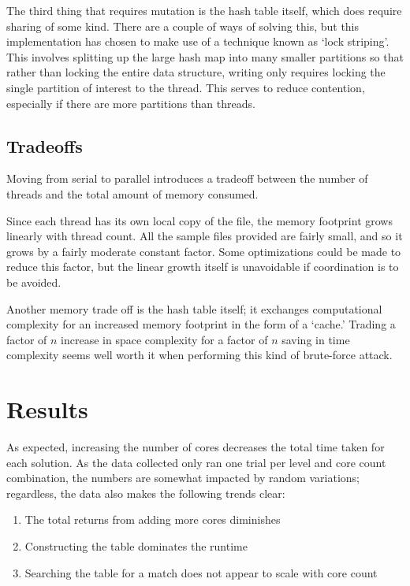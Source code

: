 \documentclass[12pt]{article}
\begin{document}
  The third thing that requires mutation is the hash table itself, which does
  require sharing of some kind. There are a couple of ways of solving this, but
  this implementation has chosen to make use of a technique known as `lock striping'.
  This involves splitting up the large hash map into many smaller partitions so
  that rather than locking the entire data structure, writing only requires locking
  the single partition of interest to the thread. This serves to reduce contention,
  especially if there are more partitions than threads.

  \subsection {Tradeoffs}
  Moving from serial to parallel introduces a tradeoff between the number of threads
  and the total amount of memory consumed. 

  Since each thread has its own local copy of the file, the memory footprint grows 
  linearly with thread count. All the sample files provided are fairly small, and
  so it grows by a fairly moderate constant factor. Some optimizations could be made
  to reduce this factor, but the linear growth itself is unavoidable if coordination 
  is to be avoided.

  Another memory trade off is the hash table itself; it exchanges computational
  complexity for an increased memory footprint in the form of a `cache.' Trading
  a factor of $n$ increase in space complexity for a factor of $n$ saving in time 
  complexity seems well worth it when performing this kind of brute-force attack.

  \section {Results}
  As expected, increasing the number of cores decreases the total time taken for
  each solution. As the data collected only ran one trial per level and core count
  combination, the numbers are somewhat impacted by random variations; regardless,
  the data also makes the following trends clear:

  \begin{enumerate}
    \item The total returns from adding more cores diminishes
    \item Constructing the table dominates the runtime
    \item Searching the table for a match does not appear to scale with core count
  \end{enumerate}
\end{document}
